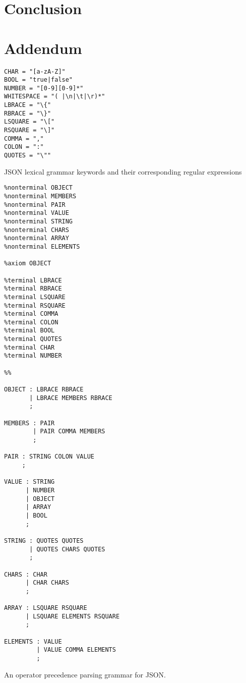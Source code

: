 \chapter{Conclusion} \label{conclusion}

\chapter{Addendum} \label{addendum}
\begin{listing}
\begin{verbatim}
CHAR = "[a-zA-Z]"
BOOL = "true|false"
NUMBER = "[0-9][0-9]*"
WHITESPACE = "( |\n|\t|\r)*"
LBRACE = "\{"
RBRACE = "\}"
LSQUARE = "\["
RSQUARE = "\]"
COMMA = ","
COLON = ":"
QUOTES = "\""
\end{verbatim}
\caption{JSON lexical grammar keywords and their corresponding regular expressions}
\label{lst:json_lexical_grammar}
\end{listing}

\begin{listing}
\begin{verbatim}
%nonterminal OBJECT
%nonterminal MEMBERS
%nonterminal PAIR
%nonterminal VALUE
%nonterminal STRING
%nonterminal CHARS
%nonterminal ARRAY
%nonterminal ELEMENTS

%axiom OBJECT

%terminal LBRACE
%terminal RBRACE
%terminal LSQUARE
%terminal RSQUARE
%terminal COMMA
%terminal COLON
%terminal BOOL
%terminal QUOTES
%terminal CHAR
%terminal NUMBER

%%

OBJECT : LBRACE RBRACE
       | LBRACE MEMBERS RBRACE
       ;

MEMBERS : PAIR
        | PAIR COMMA MEMBERS
        ;

PAIR : STRING COLON VALUE
     ;

VALUE : STRING
      | NUMBER
      | OBJECT
      | ARRAY
      | BOOL
      ;

STRING : QUOTES QUOTES
       | QUOTES CHARS QUOTES
       ;

CHARS : CHAR
      | CHAR CHARS
      ;

ARRAY : LSQUARE RSQUARE
      | LSQUARE ELEMENTS RSQUARE
      ;

ELEMENTS : VALUE
         | VALUE COMMA ELEMENTS
         ;
\end{verbatim}
\caption{An operator precedence parsing grammar for JSON.}
\label{lst:json_grammar}
\end{listing}
